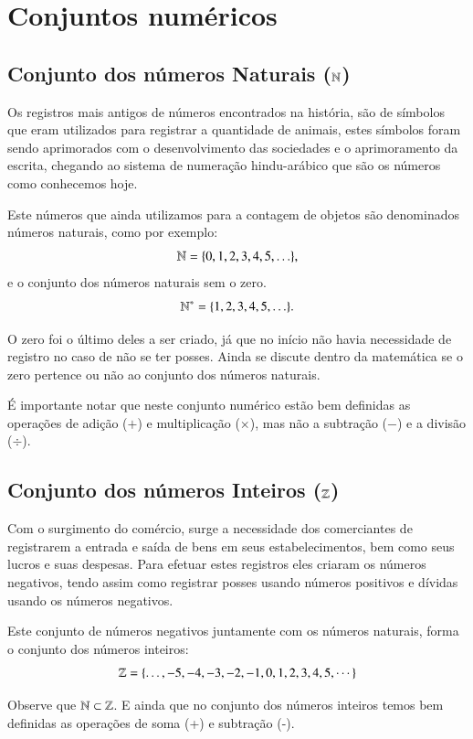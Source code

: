\chapter{Conjuntos numéricos}

 \section{Conjunto dos números Naturais (\texorpdfstring{$\mathbb{N}$}{N})}

Os registros mais antigos de números encontrados na história, são de símbolos que eram utilizados para registrar a quantidade de animais, estes símbolos foram sendo aprimorados com o desenvolvimento das sociedades e o aprimoramento da escrita, chegando ao sistema de numeração hindu-arábico que são os números como conhecemos hoje.

Este números que ainda utilizamos para a contagem de objetos são denominados números naturais, como por exemplo:
\[\mathbb{N}= \{0, 1, 2, 3, 4, 5, \ldots \},\]
e o conjunto dos números naturais sem o zero.
\[\mathbb{N}^{*}= \{1, 2, 3, 4, 5, \ldots \}.\]

O zero foi o último deles a ser criado, já que no início não havia necessidade de registro no caso de não se ter posses.
Ainda se discute dentro da matemática se o zero pertence ou não ao conjunto dos números naturais.

É importante notar que neste conjunto numérico estão bem definidas as operações de adição ($+$) e multiplicação ($\times$), mas não a subtração ($-$) e a divisão ($\div$).

\section{Conjunto dos números Inteiros (\texorpdfstring{$\mathbb{Z}$}{Z})}

Com o surgimento do comércio, surge a necessidade dos comerciantes de registrarem a entrada e saída de bens em seus estabelecimentos, bem como seus lucros e suas despesas. Para efetuar estes registros eles criaram os números negativos, tendo assim como registrar posses usando números positivos e dívidas usando os números negativos.

Este conjunto de números negativos juntamente com os números naturais, forma o conjunto dos números inteiros:
\[\mathbb{Z}= \{ \ldots , -5, -4, -3, -2, -1, 0, 1, 2, 3, 4, 5, \cdots \}\]

Observe que $\mathbb{N} \subset \mathbb{Z}$. E ainda que no conjunto dos números inteiros temos bem definidas as operações de soma (+) e subtração (-).

